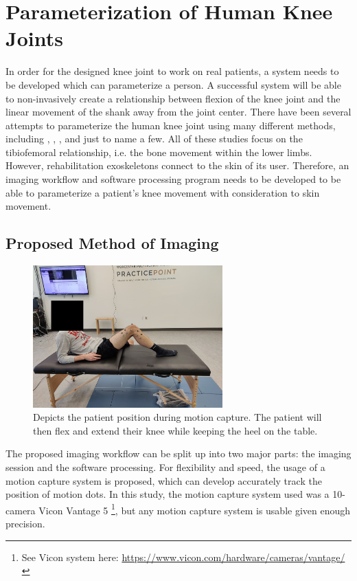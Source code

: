 \chapter{Parameterization of Human Knee Joints}
\label{sec:KneeParams}

In order for the designed knee joint to work on real patients, a system needs to be developed which can parameterize a person. A successful system will be able to non-invasively create a relationship between flexion of the knee joint and the linear movement of the shank away from the joint center. There have been several attempts to parameterize the human knee joint using many different methods, including \cite{3DKinKneeJointOldStabby}, \cite{MRIKneeShape_Unloaded}, \cite{MRIKneeShape_Loaded}, and \cite{ModelAnalysisDeepKneeFlexion} just to name a few. All of these studies focus on the tibiofemoral relationship, i.e. the bone movement within the lower limbs. However, rehabilitation exoskeletons connect to the skin of its user. Therefore, an imaging workflow and software processing program needs to be developed to be able to parameterize a patient's knee movement with consideration to skin movement.

\section{Proposed Method of Imaging}
\label{sec:ImaginKneeProcedure}

\begin{figure}[ht!]
    \centering
    \includegraphics[width=0.65\textwidth]{Figures/Param/StudyPatientPositioning.jpg}
    \caption{Depicts the patient position during motion capture. The patient will then flex and extend their knee while keeping the heel on the table.}
    \label{fig:ParamPatientPosition}
\end{figure}

The proposed imaging workflow can be split up into two major parts: the imaging session and the software processing. For flexibility and speed, the usage of a motion capture system is proposed, which can develop accurately track the position of motion dots. In this study, the motion capture system used was a 10-camera Vicon Vantage 5 \footnote{See Vicon system here: \url{https://www.vicon.com/hardware/cameras/vantage/}}, but any motion capture system is usable given enough precision. 

